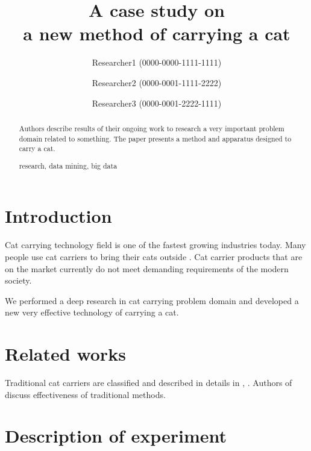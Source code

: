 \documentclass[runningheads,a4paper]{llncs}
\newcommand{\keywords}[1]{\par\addvspace\baselineskip
\noindent\keywordname\enspace\ignorespaces#1}
\begin{document}
\mainmatter  %

\title{A case study on\\
a new method of carrying a cat}


\author{Researcher1 (0000-0000-1111-1111)
\and Researcher2 (0000-0001-1111-2222)\and Researcher3 (0000-0001-2222-1111)}
%


\maketitle


\begin{abstract}
  Authors describe results of their ongoing work to research a very important
  problem domain related to something. The paper presents a method and apparatus
  designed to carry a cat.
\keywords{research, data mining, big data}
\end{abstract}


\section{Introduction}

Cat carrying technology field is one of the fastest growing industries today.
Many people use cat carriers to bring their cats outside \cite{item01}.
Cat carrier products that are on the market currently do not meet demanding
requirements of the modern society.

We performed a deep research in cat carrying problem domain and developed a new
very effective technology of carrying a cat.

\section{Related works}

Traditional cat carriers are classified and described in details in
\cite{item01}, \cite{item02}. Authors of \cite{item03} discuss effectiveness of traditional methods. 

\section{Description of experiment}
\end{document}
